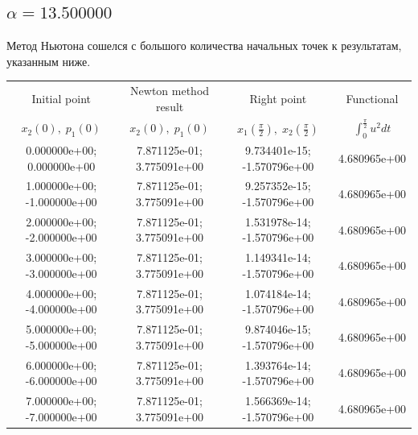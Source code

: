 \documentclass[titlepage]{article}
\def\l{\left}
\def\r{\right}
\begin{document}
\subsection{$\alpha = 13.500000$} 
Метод Ньютона сошелся с большого количества начальных точек к результатам, указанным ниже. \\ 
\begin{tabular}{ | c | c | c | c |} 
\hline 
Initial point  & Newton method result & Right point & Functional 
 \\ $x_2(0), \; p_1(0)$ & $x_2(0), \; p_1(0)$ & $x_1\l(\frac{\pi}{2}\r), \; x_2\l(\frac{\pi}{2}\r)$ & $\int_{0}^{\frac{\pi}{2}}u^2dt$  \\ \hline 
0.000000e+00; 0.000000e+00 & 7.871125e-01; 3.775091e+00 & 9.734401e-15; -1.570796e+00 & 4.680965e+00 \\ \hline 
1.000000e+00; -1.000000e+00 & 7.871125e-01; 3.775091e+00 & 9.257352e-15; -1.570796e+00 & 4.680965e+00 \\ \hline 
2.000000e+00; -2.000000e+00 & 7.871125e-01; 3.775091e+00 & 1.531978e-14; -1.570796e+00 & 4.680965e+00 \\ \hline 
3.000000e+00; -3.000000e+00 & 7.871125e-01; 3.775091e+00 & 1.149341e-14; -1.570796e+00 & 4.680965e+00 \\ \hline 
4.000000e+00; -4.000000e+00 & 7.871125e-01; 3.775091e+00 & 1.074184e-14; -1.570796e+00 & 4.680965e+00 \\ \hline 
5.000000e+00; -5.000000e+00 & 7.871125e-01; 3.775091e+00 & 9.874046e-15; -1.570796e+00 & 4.680965e+00 \\ \hline 
6.000000e+00; -6.000000e+00 & 7.871125e-01; 3.775091e+00 & 1.393764e-14; -1.570796e+00 & 4.680965e+00 \\ \hline 
7.000000e+00; -7.000000e+00 & 7.871125e-01; 3.775091e+00 & 1.566369e-14; -1.570796e+00 & 4.680965e+00 \\ \hline 
\end{tabular} 
\end{document}
